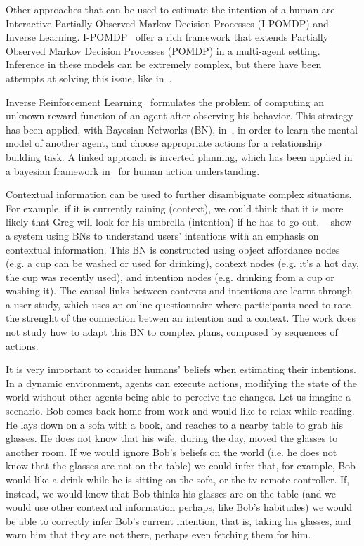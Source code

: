 Other approaches that can be used to estimate the intention of a human are Interactive Partially Observed Markov Decision Processes (I-POMDP) and Inverse Learning. I-POMDP~\citep{gmytrasiewicz2004interactive} offer a rich framework that extends Partially Observed Markov Decision Processes (POMDP) in a multi-agent setting. Inference in these models can be extremely complex, but there have been attempts at solving this issue, like in~\cite{doshi2009monte,hoang2013interactive}. 

Inverse Reinforcement Learning~\citep{ng2000algorithms} formulates the problem of computing an unknown reward function of an agent after observing his behavior. This strategy has been applied, with Bayesian Networks (BN), in~\cite{Nagai2015}, in order to learn the mental model of another agent, and choose appropriate actions for a relationship building task. A linked approach is inverted planning, which has been applied in a bayesian framework in~\cite{baker2009action}  for human action understanding.

Contextual information can be used to further disambiguate complex situations. For example, if it is currently raining (context), we could think that it is more likely that Greg will look for his umbrella (intention) if he has to go out. ~\cite{Liu2014} show a system using BNs to understand users' intentions with an emphasis on contextual information. This BN is constructed using object affordance nodes (e.g. a cup can be washed or used for drinking), context nodes (e.g. it's a hot day, the cup was recently used), and intention nodes (e.g. drinking from a cup or washing it). The causal links between contexts and intentions are learnt through a user study, which uses an online questionnaire where participants need to rate the strenght of the connection betwen an intention and a context. The work does not study how to adapt this BN to complex plans, composed by sequences of actions.

It is very important to consider humans' beliefs when estimating their intentions. In a dynamic environment, agents can execute actions, modifying the state of the world without other agents being able to perceive the changes. Let us imagine a scenario. Bob comes back home from work and would like to relax while reading. He lays down on a sofa with a book, and reaches to a nearby table to grab his glasses. He does not know that his wife, during the day, moved the glasses to another room. If we would ignore Bob's beliefs on the world (i.e. he does not know that the glasses are not on the table) we could infer that, for example, Bob would like a drink while he is sitting on the sofa, or the tv remote controller. If, instead, we would know that Bob thinks his glasses are on the table (and we would use other contextual information perhaps, like Bob's habitudes) we would be able to correctly infer Bob's current intention, that is, taking his glasses, and warn him that they are not there, perhaps even fetching them for him. 

